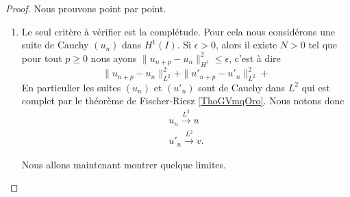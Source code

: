 \begin{proof}
    Nous prouvons point par point.
    \begin{enumerate}
        \item
            Le seul critère à vérifier est la complétude. Pour cela nous considérons une suite de Cauchy \( (u_n)\) dans \( H^1(I)\). Si \( \epsilon>0\), alors il existe \( N>0\) tel que pour tout \( p\geq 0\) nous ayons \( \| u_{n+p}-u_n \|_{H^1}^2\leq \epsilon\), c'est à dire
            \begin{equation}
                \| u_{n+p}-u_n \|^2_{L^2}+\| u'_{n+p}-u'_n \|^2_{L^2}+
            \end{equation}
            En particulier les suites \( (u_n)\) et \( (u'_n)\) sont de Cauchy dans \( L^2\) qui est complet par le théorème de Fischer-Riesz \ref{ThoGVmqOro}. Nous notons donc
            \begin{subequations}
                \begin{align}
                    u_n\stackrel{L^2}{\to}u\\
                    u'_n\stackrel{L^2}{\to}v.
                \end{align}
            \end{subequations}

            Nous allons maintenant montrer quelque limites.
\end{enumerate}
\end{proof}
